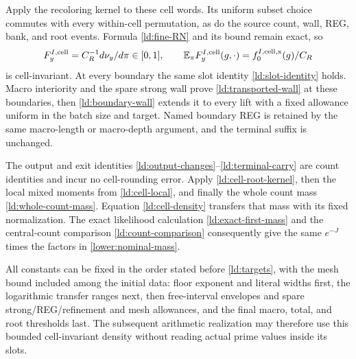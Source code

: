 Apply the recoloring kernel to these cell words.  Its uniform subset
choice commutes with every within-cell permutation, as do the source
count, wall, REG, bank, and root events.  Formula \eqref{ld:fine-RN}
and its bound remain exact, so
\begin{equation}
 F_y^{I,\rm cell}=C_R^{-1}d\nu_y/d\pi\in[0,1],\qquad
 \mathbb E_\pi F_y^{I,\rm cell}(g,\cdot)
                         =f_0^{I,\rm cell,x}(g)/C_R
 \label{ld:cell-density}
\end{equation}
is cell-invariant.  At every boundary the same slot identity
\eqref{ld:slot-identity} holds.  Macro interiority and the spare
strong wall prove \eqref{ld:transported-wall} at these boundaries,
then \eqref{ld:boundary-wall} extends it to every lift with a fixed
allowance uniform in the batch size and target.  Named boundary REG
is retained by the same macro-length or macro-depth argument, and the terminal suffix is unchanged.

The output and exit identities
\eqref{ld:output-changes}--\eqref{ld:terminal-carry} are count
identities and incur no cell-rounding error.  Apply
\eqref{ld:cell-root-kernel}, then the local mixed moments from
\eqref{ld:cell-local}, and finally the whole count mass
\eqref{ld:whole-count-mass}.  Equation \eqref{ld:cell-density}
transfers that mass with its fixed normalization.  The exact
likelihood calculation \eqref{ld:exact-first-mass} and the
central-count comparison \eqref{ld:count-comparison} consequently
give the same \(e^{-J}\) times the factors in
\eqref{lower:nominal-mass}.

All constants can be fixed in the order stated before
\eqref{ld:targets}, with the mesh bound included among the initial
data: floor exponent and literal widths first, the logarithmic
transfer ranges next, then free-interval envelopes and spare
strong/REG/refinement and mesh allowances, and the final macro,
total, and root thresholds last.  The subsequent arithmetic
realization may therefore use this bounded cell-invariant density
without reading actual prime values inside its slots.
